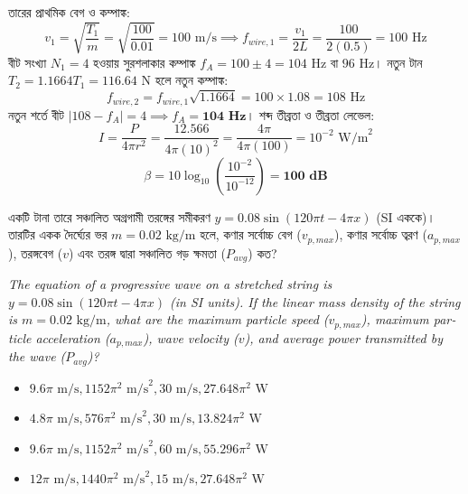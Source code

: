 \documentclass[12pt, a4paper]{article}
\begin{document}
\begin{tcolorbox}[solutionbox={সমাধান (Solution)}]
    \noindent
    তারের প্রাথমিক বেগ ও কম্পাঙ্ক:
    \[ v_1 = \sqrt{\frac{T_1}{m}} = \sqrt{\frac{100}{0.01}} = 100\text{ m/s} \implies f_{wire,1} = \frac{v_1}{2L} = \frac{100}{2(0.5)} = 100\text{ Hz} \]
    বীট সংখ্যা $N_1 = 4$ হওয়ায় সুরশলাকার কম্পাঙ্ক $f_A = 100 \pm 4 = 104\text{ Hz}$ বা $96\text{ Hz}$। নতুন টান $T_2 = 1.1664 T_1 = 116.64\text{ N}$ হলে নতুন কম্পাঙ্ক:
    \[ f_{wire,2} = f_{wire,1}\sqrt{1.1664} = 100 \times 1.08 = 108\text{ Hz} \]
    নতুন শর্তে বীট $|108 - f_A| = 4 \implies f_A = \mathbf{104\text{ Hz}}$। শব্দ তীব্রতা ও তীব্রতা লেভেল:
    \[ I = \frac{P}{4\pi r^2} = \frac{12.566}{4\pi(10)^2} = \frac{4\pi}{4\pi(100)} = 10^{-2}\text{ W/m}^2 \]
    \[ \beta = 10 \log_{10}\left(\frac{10^{-2}}{10^{-12}}\right) = \mathbf{100\text{ dB}} \]
\end{tcolorbox}

\vspace{2em}

\begin{tcolorbox}[questionbox={প্রশ্ন (Question) 17}]
    \noindent
    একটি টানা তারে সঞ্চালিত অগ্রগামী তরঙ্গের সমীকরণ $y = 0.08 \sin(120\pi t - 4\pi x)$ (SI এককে)। তারটির একক দৈর্ঘ্যের ভর $m = 0.02\text{ kg/m}$ হলে, কণার সর্বোচ্চ বেগ ($v_{p,max}$), কণার সর্বোচ্চ ত্বরণ ($a_{p,max}$), তরঙ্গবেগ ($v$) এবং তরঙ্গ দ্বারা সঞ্চালিত গড় ক্ষমতা ($P_{avg}$) কত?
    
    \vspace{0.8em}
    \begin{english}
    \noindent\textit{\color{darkgray}
    The equation of a progressive wave on a stretched string is $y = 0.08 \sin(120\pi t - 4\pi x)$ (in SI units). If the linear mass density of the string is $m = 0.02\text{ kg/m}$, what are the maximum particle speed ($v_{p,max}$), maximum particle acceleration ($a_{p,max}$), wave velocity ($v$), and average power transmitted by the wave ($P_{avg}$)?
    }
    \end{english}
\end{tcolorbox}

\begin{itemize}[label={}, leftmargin=1cm, itemsep=0.5em]
    \item[\textbf{A)}] $9.6\pi\text{ m/s}, 1152\pi^2\text{ m/s}^2, 30\text{ m/s}, 27.648\pi^2\text{ W}$
    \item[\textbf{B)}] $4.8\pi\text{ m/s}, 576\pi^2\text{ m/s}^2, 30\text{ m/s}, 13.824\pi^2\text{ W}$
    \item[\textbf{C)}] $9.6\pi\text{ m/s}, 1152\pi^2\text{ m/s}^2, 60\text{ m/s}, 55.296\pi^2\text{ W}$
    \item[\textbf{D)}] $12\pi\text{ m/s}, 1440\pi^2\text{ m/s}^2, 15\text{ m/s}, 27.648\pi^2\text{ W}$
\end{itemize}
\end{document}
